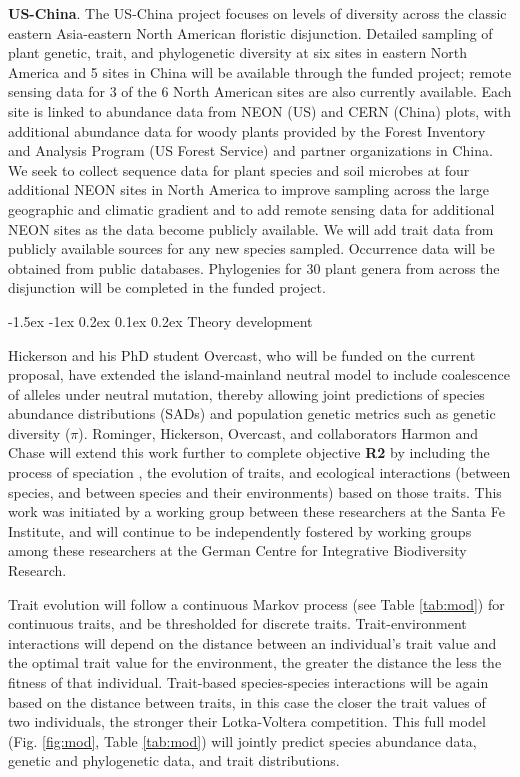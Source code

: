 \documentclass[11pt]{article}
\makeatletter
\renewcommand\subsubsection{\@startsection{subsection}{1}{\z@}%
                                  {-1.5ex \@plus -1ex \@minus 0.2ex}%
                                  {0.1ex \@plus 0.2ex}%
                                  {\normalfont\bfseries}}
\makeatother
\begin{document}
\textbf{US-China}. The US-China project focuses on levels of diversity
across the classic eastern Asia-eastern North American floristic
disjunction. Detailed sampling of plant genetic, trait, and
phylogenetic diversity at six sites in eastern North America and 5
sites in China will be available through the funded project; remote
sensing data for 3 of the 6 North American sites are also currently
available. Each site is linked to abundance data from NEON (US) and
CERN (China) plots, with additional abundance data for woody plants
provided by the Forest Inventory and Analysis Program (US Forest
Service) and partner organizations in China. We seek to collect
sequence data for plant species and soil microbes at four additional
NEON sites in North America to improve sampling across the large
geographic and climatic gradient and to add remote sensing data for
additional NEON sites as the data become publicly available. We will
add trait data from publicly available sources for any new species
sampled. Occurrence data will be obtained from public
databases. Phylogenies for 30 plant genera from across the disjunction
will be completed in the funded project.


\subsubsection{Theory development}\label{theory-development}

Hickerson and his PhD student Overcast, who will be funded on the
current proposal, have extended the island-mainland neutral model
\cite{Rosindell2013-di} to include coalescence of alleles under
neutral mutation, thereby allowing joint predictions of species
abundance distributions (SADs) and population genetic metrics such as
genetic diversity ($\pi$). Rominger, Hickerson, Overcast, and
collaborators Harmon and Chase will extend this work further to
complete objective \textbf{R2} by including the process of speciation
\cite{Rosindell2010-gq}, the evolution of traits, and ecological
interactions (between species, and between species and their
environments) based on those traits. This work was initiated by a
working group between these researchers at the Santa Fe Institute, and
will continue to be independently fostered by working groups among
these researchers at the German Centre for Integrative Biodiversity
Research.

Trait evolution will follow a continuous Markov process (see Table
\ref{tab:mod}) for continuous traits, and be thresholded
\cite{Felsenstein2012-aj} for discrete traits. Trait-environment
interactions will depend on the distance between an individual's trait
value and the optimal trait value for the environment, the greater the
distance the less the fitness of that individual. Trait-based
species-species interactions will be again based on the distance
between traits, in this case the closer the trait values of two
individuals, the stronger their Lotka-Voltera \cite{Wilson2003-kp}
competition. This full model (Fig. \ref{fig:mod}, Table \ref{tab:mod})
will jointly predict species abundance data, genetic and phylogenetic
data, and trait distributions.
\end{document}
